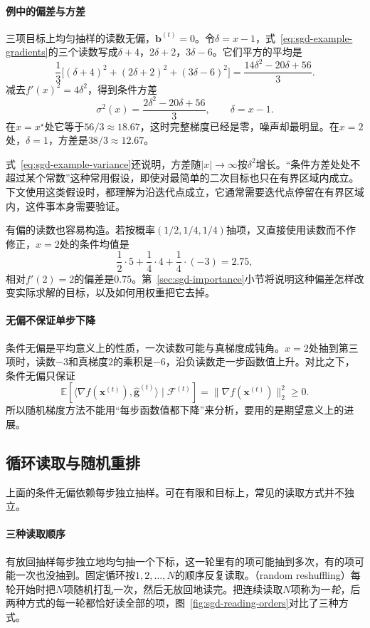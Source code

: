 \paragraph{例中的偏差与方差}
三项目标上均匀抽样的读数无偏，$\bm{b}^{(t)}=0$。令$\delta=x-1$，式~\eqref{eq:sgd-example-gradients}的三个读数写成$\delta+4$，$2\delta+2$，$3\delta-6$。它们平方的平均是
\[
 \frac13\bigl[(\delta+4)^2+(2\delta+2)^2+(3\delta-6)^2\bigr]=\frac{14\delta^2-20\delta+56}{3}.
\]
减去$f'(x)^2=4\delta^2$，得到条件方差
\begin{equation}
 \sigma^2(x)=\frac{2\delta^2-20\delta+56}{3},\qquad \delta=x-1.
 \label{eq:sgd-example-variance}
\end{equation}
在$x=x^\star$处它等于$56/3\approx18.67$，这时完整梯度已经是零，噪声却最明显。在$x=2$处，$\delta=1$，方差是$38/3\approx12.67$。

式~\eqref{eq:sgd-example-variance}还说明，方差随$\lvert x\rvert\to\infty$按$\delta^2$增长。“条件方差处处不超过某个常数”这种常用假设，即使对最简单的二次目标也只在有界区域内成立。下文使用这类假设时，都理解为沿迭代点成立，它通常需要迭代点停留在有界区域内，这件事本身需要验证。

有偏的读数也容易构造。若按概率$(1/2,1/4,1/4)$抽项，又直接使用读数而不作修正，$x=2$处的条件均值是
\[
 \frac12\cdot5+\frac14\cdot4+\frac14\cdot(-3)=2.75,
\]
相对$f'(2)=2$的偏差是$0.75$。第~\ref{sec:sgd-importance}小节将说明这种偏差怎样改变实际求解的目标，以及如何用权重把它去掉。

\paragraph{无偏不保证单步下降}
条件无偏是平均意义上的性质，一次读数可能与真梯度成钝角。$x=2$处抽到第三项时，读数$-3$和真梯度$2$的乘积是$-6$，沿负读数走一步函数值上升。对比之下，条件无偏只保证
\[
 \mathbb{E}[\langle\nabla f(\bm{x}^{(t)}),\hat{\bm{g}}^{(t)}\rangle\mid\mathcal{F}^{(t)}]=\lVert\nabla f(\bm{x}^{(t)})\rVert_2^2\geq0.
\]
所以随机梯度方法不能用“每步函数值都下降”来分析，要用的是期望意义上的进展。

\subsection{循环读取与随机重排}
\label{sec:sgd-reading-orders}

上面的条件无偏依赖每步独立抽样。可在有限和目标上，常见的读取方式并不独立。

\paragraph{三种读取顺序}
有放回抽样每步独立地均匀抽一个下标，这一轮里有的项可能抽到多次，有的项可能一次也没抽到。固定循环按$1,2,\ldots,N$的顺序反复读取。（random reshuffling）每轮开始时把$N$项随机打乱一次，然后无放回地读完。把连续读取$N$项称为一\emph{轮}，后两种方式的每一轮都恰好读全部的项，图~\ref{fig:sgd-reading-orders}对比了三种方式。

